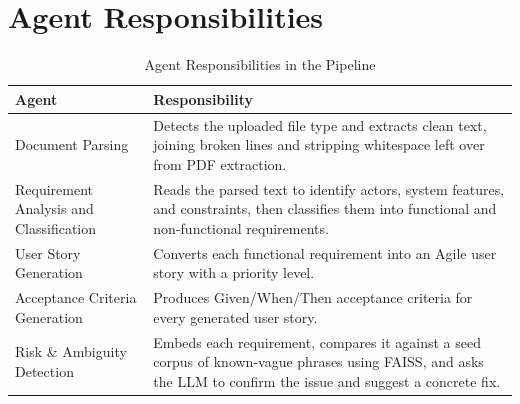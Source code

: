 \section{Agent Responsibilities}
\begin{longtable}{|p{3.3cm}|p{9.8cm}|}
\caption{Agent Responsibilities in the Pipeline}\\
\hline
\textbf{Agent} & \textbf{Responsibility} \\
\hline
Document Parsing & Detects the uploaded file type and extracts clean text, joining broken lines and stripping whitespace left over from PDF extraction. \\
\hline
Requirement Analysis and Classification & Reads the parsed text to identify actors, system features, and constraints, then classifies them into functional and non-functional requirements. \\
\hline
User Story Generation & Converts each functional requirement into an Agile user story with a priority level. \\
\hline
Acceptance Criteria Generation & Produces Given/When/Then acceptance criteria for every generated user story. \\
\hline
Risk \& Ambiguity Detection & Embeds each requirement, compares it against a seed corpus of known-vague phrases using FAISS, and asks the LLM to confirm the issue and suggest a concrete fix. \\
\hline
\end{longtable}

